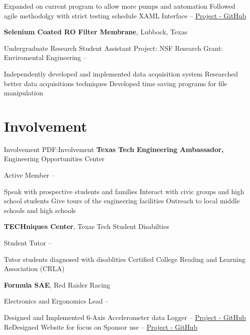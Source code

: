 \documentclass[a4paper,10pt,oneside]{article}
\begin{document}
\begin{body}
\begin{detail}
\BulletItem
Expanded on current program to allow more pumps and automation
\BulletItem
Followed agile methodolgy with strict testing schedule
\BulletItem
XAML Interface --  \href{https://github.com/rahutchinson/Pump_Control}{\underline{Project - GitHub}}
\end{detail}
\SmallEntryGap
{\textbf{Selenium Coated RO Filter Membrane}},
Lubbock, Texas
\par
\Item
Undergraduate Research Student Assistant
\Item
Project:
NSF Research Grant: Enviromental Engineering
\hfill
{} --
\begin{detail}
\BulletItem
Independently developed and implemented data acquisition system
\BulletItem
Researched better data acquisitions techniques
\BulletItem
Developed time saving programs for file manipulation
\end{detail}

\section
{Involvement}
{Involvement}
{PDF:Involvement}
{\textbf{Texas Tech Engineering Ambassador,}  Engineering Opportunities Center}
\par
\Item
Active Member
\hfill
{} --
\begin{detail}
\BulletItem
Speak with prospective students and families 
\BulletItem
Interact with civic groups and high school students
\BulletItem
Give tours of the engineering facilities
\BulletItem
Outreach to local middle schools and high schools
\end{detail}
\SmallEntryGap
{\textbf{TECHniques Center}, Texas Tech Student Disabilties}

\par
\Item
Student Tutor
\hfill
{} --
\begin{detail}
\BulletItem Tutor students diagnosed with disablities
\BulletItem Certified College Reading and Learning Association (CRLA)
\end{detail}
\SmallEntryGap
{\textbf{Formula SAE}, Red Raider Racing}
\par
\Item
Electronics and Ergonomics Lead
\hfill
{} --
\begin{detail}
\BulletItem
Designed and Implemented 6-Axis Accelerometer data Logger -- \href{https://github.com/rahutchinson/FDRM64-6Axis-2-SDCARD}{\underline{Project - GitHub}}
\BulletItem
ReDesigned Website for focus on Sponsor use -- \href{https://github.com/rahutchinson/FSAE_Site}{\underline{Project - GitHub}}
\end{detail}



\end{body}
\end{document}
